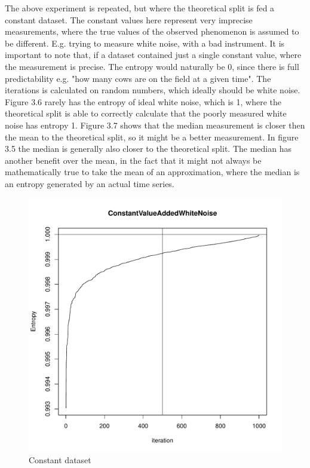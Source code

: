 The above experiment is repeated, but where the theoretical split is fed a constant dataset. The constant values here represent very imprecise measurements, where the true values of the observed phenomenon is assumed to be different. E.g. trying to measure white noise, with a bad instrument. It is important to note that, if a dataset contained just a single constant value, where the measurement is precise. The entropy would naturally be 0, since there is full predictability e.g. "how many cows are on the field at a given time". The iterations is calculated on random numbers, which ideally should be white noise. Figure 3.6 rarely has the entropy of ideal white noise, which is 1, where the theoretical split is able to correctly calculate that the poorly measured white noise has entropy 1. Figure 3.7 shows that the median measurement is closer then the mean to the theoretical split, so it might be a better measurement. In figure 3.5 the median is generally also closer to the theoretical split. The median has another benefit over the mean, in the fact that it might not always be mathematically true to take the mean of an approximation, where the median is an entropy generated by an actual time series.

\begin{figure}
    \centering
\includegraphics[width=\textwidth,keepaspectratio]{Weather/constantWithWhiteNoiseStochasticTheoretical.pdf}
    \caption{Constant dataset}
\end{figure}

